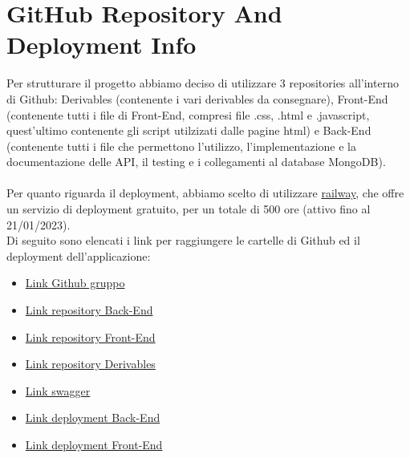 \section{GitHub Repository And Deployment Info}

Per strutturare il progetto abbiamo deciso di utilizzare 3 repositories all'interno di Github: Derivables (contenente i vari derivables da consegnare), Front-End (contenente tutti i file di Front-End, compresi file .css, .html e .javascript, quest'ultimo contenente gli script utilzizati dalle pagine html) e Back-End (contenente tutti i file che permettono l'utilizzo, l'implementazione e la documentazione delle API, il testing e i collegamenti al database MongoDB).
\\
\\
Per quanto riguarda il deployment, abbiamo scelto di utilizzare \href{https://railway.app/}{railway}, che offre un servizio di deployment gratuito, per un totale di 500 ore (attivo fino al 21/01/2023).
\\
Di seguito sono elencati i link per raggiungere le cartelle di Github ed il deployment dell'applicazione:
\begin{itemize}
    \item \href{https://github.com/progettoGruppoT24}{Link Github gruppo}
    \item \href{https://github.com/progettoGruppoT24/Back-End}{Link repository Back-End}
    \item \href{https://github.com/progettoGruppoT24/Front-End}{Link repository Front-End}
    \item \href{https://github.com/progettoGruppoT24/Derivables}{Link repository Derivables}
    \item \href{https://jguesser-backend-unitn.up.railway.app/api-docs/}{Link swagger}
    \item \href{https://jguesser-backend-unitn.up.railway.app/}{Link deployment Back-End}
    \item \href{https://jguesser-unitn-se-group24.up.railway.app/}{Link deployment Front-End}
\end{itemize}